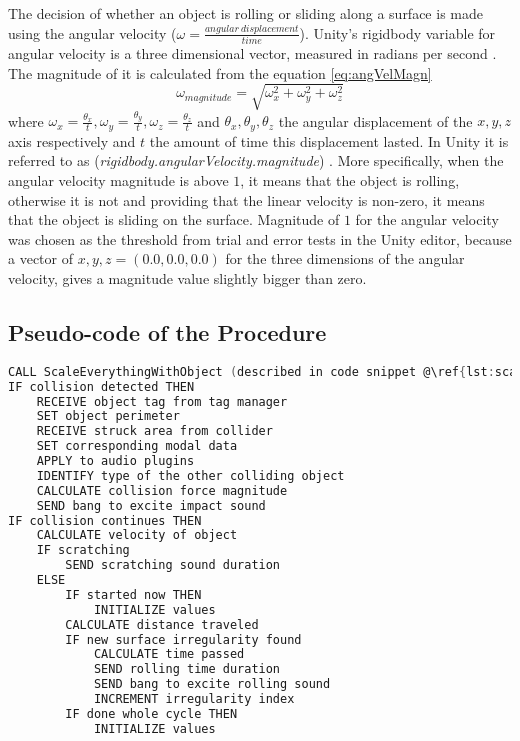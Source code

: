 The decision of whether an object is rolling or sliding along a surface is made using the angular velocity ($\omega = \frac{angular\ displacement}{time}$). Unity\textsuperscript{\textregistered}'s rigidbody variable for angular velocity is a three dimensional vector, measured in radians per second \cite{bib:unity_doc}. The magnitude of it is calculated from the equation \ref{eq:angVelMagn}
\begin{equation}\label{eq:angVelMagn}
\omega_{magnitude} = \sqrt{\omega_x^2+\omega_y^2+\omega_z^2}
\end{equation}
where $\omega_x = \frac{\theta_x}{t}, \omega_y = \frac{\theta_y}{t}, \omega_z = \frac{\theta_z}{t}$ and $\theta_x, \theta_y, \theta_z$ the angular displacement of the $x, y, z$ axis respectively and $t$ the amount of time this displacement lasted. In Unity\textsuperscript{\textregistered} it is referred to as (\textit{rigidbody.angularVelocity.magnitude}) \cite{bib:unity_doc}. More specifically, when the angular velocity magnitude is above $1$, it means that the object is rolling, otherwise it is not and providing that the linear velocity is non-zero, it means that the object is sliding on the surface. Magnitude of $1$ for the angular velocity was chosen as the threshold from trial and error tests in the Unity\textsuperscript{\textregistered} editor, because a vector of $x, y, z = (0.0, 0.0, 0.0)$ for the three dimensions of the angular velocity, gives a magnitude value slightly bigger than zero.



\subsection{Pseudo-code of the Procedure }

\begin{lstlisting}[caption={Code of the whole procedure},label={lst:all_code},language=C, escapechar=@]
CALL ScaleEverythingWithObject (described in code snippet @\ref{lst:scale}@)
IF collision detected THEN
	RECEIVE object tag from tag manager
	SET object perimeter
	RECEIVE struck area from collider
	SET corresponding modal data
	APPLY to audio plugins
	IDENTIFY type of the other colliding object
	CALCULATE collision force magnitude
	SEND bang to excite impact sound
IF collision continues THEN
	CALCULATE velocity of object
	IF scratching
		SEND scratching sound duration
	ELSE
		IF started now THEN
			INITIALIZE values
		CALCULATE distance traveled
		IF new surface irregularity found
			CALCULATE time passed
			SEND rolling time duration
			SEND bang to excite rolling sound
			INCREMENT irregularity index
		IF done whole cycle THEN
			INITIALIZE values	
\end{lstlisting}





